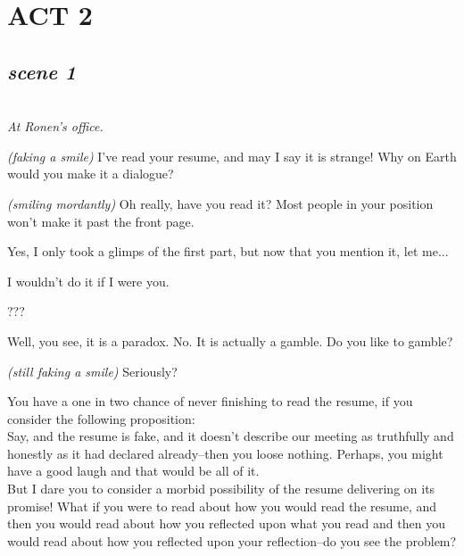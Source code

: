 \documentclass[11pt,a4paper,oneside]{memoir}
\begin{document}
\chapter*{ACT 2}

\section*{\hfill\textit{scene 1}}
\begin{description}[itemsep=1ex,leftmargin=1cm]
  \setlength{\parskip}{5pt}

\item[] \hfill \\
  \textit{At Ronen's office.}

\item[Ronen] \textit{(faking a smile)} I've read your resume, and may
  I say it is strange! Why on Earth would you make it a dialogue?

\item[Oleg] \textit{(smiling mordantly)} Oh really, have you read it?
  Most people in your position won't make it past the front page.

\item[Ronen] Yes, I only took a glimps of the first part, but now that
  you mention it, let me...

\item[Oleg] I wouldn't do it if I were you.

\item[Ronen] ???

\item[Oleg] Well, you see, it is a paradox. No. It is actually a gamble.
  Do you like to gamble?

\item[Ronen] \textit{(still faking a smile)} Seriously?

\item[Oleg] You have a one in two chance of never finishing to read the
  resume, if you consider the following proposition:\\
  Say, and the resume is fake, and it doesn't describe our meeting as
  truthfully and honestly as it had declared already--then you loose
  nothing. Perhaps, you might have a good laugh and that would be all
  of it.\\
  But I dare you to consider a morbid possibility of the resume delivering
  on its promise! What if you were to read about how you would read
  the resume, and then you would read about how you reflected upon what
  you read and then you would read about how you reflected upon your
  reflection--do you see the problem?


\end{description}
\end{document}
